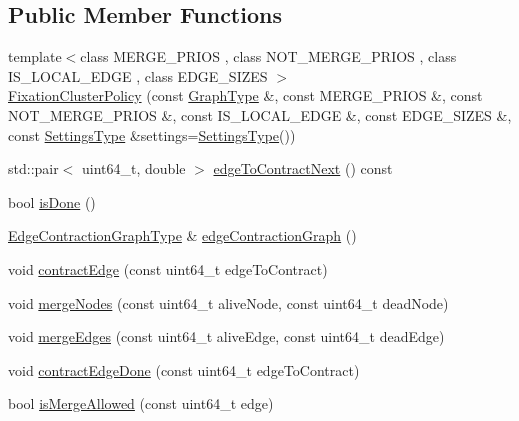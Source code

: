 \subsection*{Public Member Functions}
\begin{DoxyCompactItemize}
\item 
{\footnotesize template$<$class M\+E\+R\+G\+E\+\_\+\+P\+R\+I\+OS , class N\+O\+T\+\_\+\+M\+E\+R\+G\+E\+\_\+\+P\+R\+I\+OS , class I\+S\+\_\+\+L\+O\+C\+A\+L\+\_\+\+E\+D\+GE , class E\+D\+G\+E\+\_\+\+S\+I\+Z\+ES $>$ }\\\hyperlink{classnifty_1_1graph_1_1agglo_1_1FixationClusterPolicy_a51578ad08a76d4548c6b954af2fa3aa6}{Fixation\+Cluster\+Policy} (const \hyperlink{classnifty_1_1graph_1_1agglo_1_1FixationClusterPolicy_a1b20f47fae0c5f5a247ca049bb60400b}{Graph\+Type} \&, const M\+E\+R\+G\+E\+\_\+\+P\+R\+I\+OS \&, const N\+O\+T\+\_\+\+M\+E\+R\+G\+E\+\_\+\+P\+R\+I\+OS \&, const I\+S\+\_\+\+L\+O\+C\+A\+L\+\_\+\+E\+D\+GE \&, const E\+D\+G\+E\+\_\+\+S\+I\+Z\+ES \&, const \hyperlink{structnifty_1_1graph_1_1agglo_1_1FixationClusterPolicy_1_1SettingsType}{Settings\+Type} \&settings=\hyperlink{structnifty_1_1graph_1_1agglo_1_1FixationClusterPolicy_1_1SettingsType}{Settings\+Type}())
\item 
std\+::pair$<$ uint64\+\_\+t, double $>$ \hyperlink{classnifty_1_1graph_1_1agglo_1_1FixationClusterPolicy_a51448fa98e311f4f919756c63d23bffd}{edge\+To\+Contract\+Next} () const
\item 
bool \hyperlink{classnifty_1_1graph_1_1agglo_1_1FixationClusterPolicy_a43bb236c15e94df8bb5ad29c96aac82c}{is\+Done} ()
\item 
\hyperlink{classnifty_1_1graph_1_1agglo_1_1FixationClusterPolicy_a90a9ab49f79eb7f52da75825e50a1c15}{Edge\+Contraction\+Graph\+Type} \& \hyperlink{classnifty_1_1graph_1_1agglo_1_1FixationClusterPolicy_a4648508b926e757339b4bf219233764f}{edge\+Contraction\+Graph} ()
\item 
void \hyperlink{classnifty_1_1graph_1_1agglo_1_1FixationClusterPolicy_ab46ef0cd4affa4be6be2ba58409ad4c3}{contract\+Edge} (const uint64\+\_\+t edge\+To\+Contract)
\item 
void \hyperlink{classnifty_1_1graph_1_1agglo_1_1FixationClusterPolicy_a8b8ff08799421e908f4c2d4b004816f3}{merge\+Nodes} (const uint64\+\_\+t alive\+Node, const uint64\+\_\+t dead\+Node)
\item 
void \hyperlink{classnifty_1_1graph_1_1agglo_1_1FixationClusterPolicy_a0dab460de96a588b52090cc3d57a6f31}{merge\+Edges} (const uint64\+\_\+t alive\+Edge, const uint64\+\_\+t dead\+Edge)
\item 
void \hyperlink{classnifty_1_1graph_1_1agglo_1_1FixationClusterPolicy_ae9a6837ab324d3e7d4d63291ab49f637}{contract\+Edge\+Done} (const uint64\+\_\+t edge\+To\+Contract)
\item 
bool \hyperlink{classnifty_1_1graph_1_1agglo_1_1FixationClusterPolicy_a1a8eb8cd1c5f881d705bd75714a2bec6}{is\+Merge\+Allowed} (const uint64\+\_\+t edge)
\end{DoxyCompactItemize}
